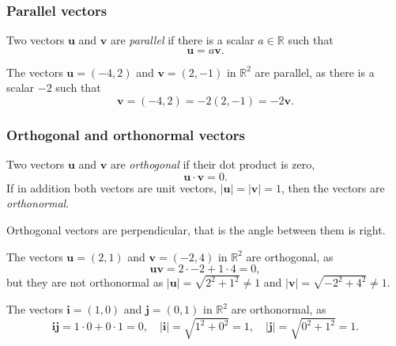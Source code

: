 \begin{frame}
\frametitle{Parallel vectors}
\begin{definition}
Two vectors $\mathbf{u}$ and $\mathbf{v}$ are \emph{parallel} if there is a scalar $a\in\mathbb{R}$ such that 
\[
\mathbf{u} = a\mathbf{v}.
\]
\end{definition}

The vectors $\mathbf{u}=(-4,2)$ and $\mathbf{v}=(2,-1)$ in $\mathbb{R}^2$ are parallel, as there is a scalar $-2$ such that
\[
\mathbf{v}= (-4,2) = -2(2,-1) = -2\mathbf{v}.
\]
\end{frame}


\begin{frame}
\frametitle{Orthogonal and orthonormal vectors}
\begin{definition}
Two vectors $\mathbf{u}$ and $\mathbf{v}$ are \emph{orthogonal} if their dot product is zero,
\[
\mathbf{u}\cdot \mathbf{v} = 0.
\]
If in addition both vectors are unit vectors, $|\mathbf{u}|=|\mathbf{v}|=1$, then the vectors are \emph{orthonormal}.
\end{definition}

Orthogonal vectors are perpendicular, that is the angle between them is right.

The vectors $\mathbf{u}=(2,1)$ and $\mathbf{v}=(-2,4)$ in $\mathbb{R}^2$ are orthogonal, as
\[
\mathbf{u}\mathbf{v} = 2\cdot -2 +1\cdot 4 = 0,
\]
but they are not orthonormal as $|\mathbf{u}| = \sqrt{2^2+1^2} \neq 1$ and $|\mathbf{v}| = \sqrt{-2^2+4^2} \neq 1$.

The vectors $\mathbf{i}=(1,0)$ and $\mathbf{j}=(0,1)$ in $\mathbb{R}^2$ are orthonormal, as
\[
\mathbf{i}\mathbf{j} = 1\cdot 0 +0\cdot 1 = 0, \quad |\mathbf{i}| = \sqrt{1^2+0^2} = 1,  \quad |\mathbf j| = \sqrt{0^2+1^2} = 1.
\]
\end{frame}



